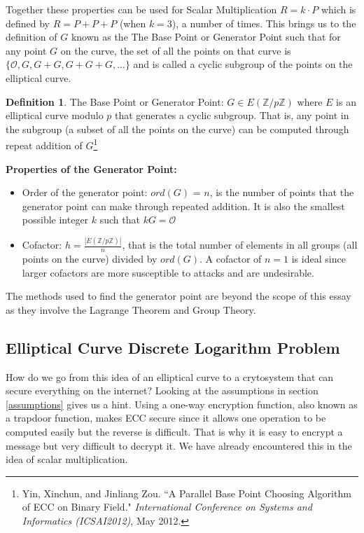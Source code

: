 \documentclass[a4paper,12pt]{article}
\theoremstyle{definition}
\newtheorem{definition}{Definition}
\begin{document}
Together these properties can be used for Scalar Multiplication $R = k\cdot P$ which is defined by $R = P + P + P$ (when $k = 3$), a number of times. This brings us to the definition of $G$ known as the The Base Point or Generator Point such that for any point $G$ on the curve, the set of all the points on that curve is $\{\mathcal{O},G,G+G,G+G+G,...\}$ and is called a cyclic subgroup of the points on the elliptical curve.
\begin{definition}{The Base Point or Generator Point:}
	$G \in E(\mathbb{Z}/p\mathbb{Z})$ where $E$ is an elliptical curve modulo $p$ that generates a cyclic subgroup. That is, any point in the subgroup (a subset of all the points on the curve) can be computed through repeat addition of $G$\footnote{Yin, Xinchun, and Jinliang Zou. ``A Parallel Base Point Choosing Algorithm of ECC on Binary Field." \textit{International Conference on Systems and Informatics (ICSAI2012)}, May 2012.}
\end{definition}
\textbf{Properties of the Generator Point:}
\begin{itemize}
	\item Order of the generator point: $ord(G)$ = $n$, is the number of points that the generator point can make through repeated addition. It is also the smallest possible integer $k$ such that $kG=\mathcal{O}$
	\item Cofactor: $h=\frac{|E(\mathbb{Z}/p\mathbb{Z})|}{n}$, that is the total number of elements in all groups (all points on the curve) divided by $ord(G)$. A cofactor of $n=1$ is ideal since larger cofactors are more susceptible to attacks and are undesirable.
\end{itemize}
The methods used to find the generator point are beyond the scope of this essay as they involve the Lagrange Theorem and Group Theory.

\subsection{Elliptical Curve Discrete Logarithm Problem} \label{ECDLP}
How do we go from this idea of an elliptical curve to a crytosystem that can secure everything on the internet? Looking at the assumptions in section \ref{assumptions} gives us a hint. Using a one-way encryption function, also known as a trapdoor function, makes ECC secure since it allows one operation to be computed easily but the reverse is difficult. That is why it is easy to encrypt a message but very difficult to decrypt it. We have already encountered this in the idea of scalar multiplication.
\end{document}
